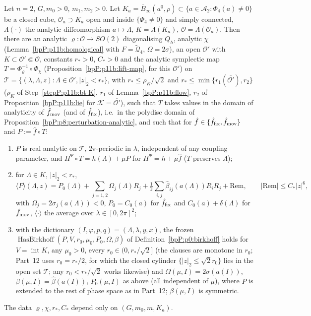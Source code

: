 \begin{theorem}\label{bpP:p11b:birkhoff-form}
Let $n=2$, $G,m_0>0$, $m_1,m_2>0$. Let $K_a=\overline B_\infty(a^0,\rho)\subset\{a\in\mathcal A_2:\Phi_4(a)\ne0\}$ be a closed cube, $\mathcal O_a\supset K_a$ open and inside $\{\Phi_4\ne0\}$ and simply connected, $\Lambda(\cdot)$ the analytic diffeomorphism $a\mapsto\Lambda$, $K=\Lambda(K_a)$, $\mathcal O=\Lambda(\mathcal O_a)$. Then there are an analytic $\varrho:\mathcal O\to SO(2)$ diagonalising $Q_h$, analytic $\chi$ (Lemma~\ref{bpP:p11b:homological} with $F=\tilde{\mathcal Q}_4$, $\Omega=2\sigma$), an open $\mathcal O'$ with $K\subset\mathcal O'\Subset\mathcal O$, constants $r_*>0$, $C_*>0$ and the analytic symplectic map $T=\Phi_\varrho^{-1}\circ\Phi_\chi$ (Proposition~\ref{bpP:p11b:lift-map}, for this $\mathcal O'$) on $\mathcal T=\{(\lambda,\Lambda,z):\Lambda\in\mathcal O',\lvert z\rvert_2<r_*\}$, with $r_*\le\rho_K/\sqrt2$ and $r_*\le\min\{r_1(\overline{\mathcal O'}),r_2\}$ ($\rho_K$ of Step~\ref{stepP:p11b:bt-K}, $r_1$ of Lemma~\ref{bpP:p11b:flow}, $r_2$ of Proposition~\ref{bpP:p11b:lie} for $\mathcal K=\overline{\mathcal O'}$), such that $T$ takes values in the domain of analyticity of $\hat f_{\rm mov}$ (and of $\hat f_{\rm fix}$), i.e.\ in the polydisc domain of Proposition~\ref{bpP:p8:perturbation-analytic}, and such that for $\hat f\in\{\hat f_{\rm fix},\hat f_{\rm mov}\}$ and $P:=\hat f\circ T$:
\begin{enumerate}[label=(\alph*)]
\item $P$ is real analytic on $\mathcal T$, $2\pi$-periodic in $\lambda$, independent of any coupling parameter, and $H^\Psi\circ T=h(\Lambda)+\mu P$ for $H^\Psi=h+\mu\hat f$ ($T$ preserves $\Lambda$);
\item for $\Lambda\in K$, $\lvert z\rvert_2<r_*$,
\[\langle P\rangle(\Lambda,z)=P_0(\Lambda)+\sum_{j=1,2}\Omega_j(\Lambda)R_j+\tfrac12\sum_{i,j}\hat\beta_{ij}(a(\Lambda))R_iR_j+\mathrm{Rem},\qquad\lvert\mathrm{Rem}\rvert\le C_*\lvert z\rvert^6,\]
with $\Omega_j=2\sigma_j(a(\Lambda))<0$, $P_0=C_0(a)$ for $\hat f_{\rm fix}$ and $C_0(a)+\delta(\Lambda)$ for $\hat f_{\rm mov}$, $\langle\cdot\rangle$ the average over $\lambda\in[0,2\pi]^2$;
\item with the dictionary $(I,\varphi,p,q)=(\Lambda,\lambda,y,x)$, the frozen $\operatorname{HasBirkhoff}(P,V,r_0,\mu_0,P_0,\Omega,\beta)$ of Definition~\ref{bpP:p0:birkhoff} holds for $V=\operatorname{int}K$, any $\mu_0>0$, every $r_0\in(0,r_*/\sqrt2]$ (the clauses are monotone in $r_0$; Part~12 uses $r_0=r_*/2$, for which the closed cylinder $\{\lvert z\rvert_2\le\sqrt2r_0\}$ lies in the open set $\mathcal T$; any $r_0<r_*/\sqrt2$ works likewise) and $\Omega(\mu,I)=2\sigma(a(I))$, $\beta(\mu,I)=\hat\beta(a(I))$, $P_0(\mu,I)$ as above (all independent of $\mu$), where $P$ is extended to the rest of phase space as in Part~12; $\beta(\mu,I)$ is symmetric.
\end{enumerate}
The data $\varrho,\chi,r_*,C_*$ depend only on $(G,m_0,m,K_a)$.
\end{theorem}
